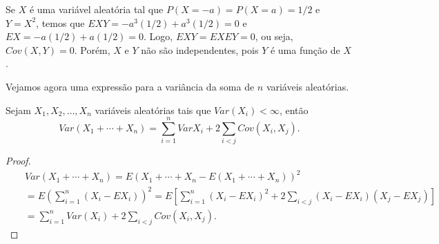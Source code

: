 \begin{frame}
%
%
\begin{exem}
Se $X$ é uma variável aleatória tal que $P(X=-a)=P(X=a)=1/2$ e
$Y=X^2$, temos que $EXY=-a^3(1/2)+a^3(1/2)=0$ e
$EX=-a(1/2)+a(1/2)=0$. Logo, $EXY=EXEY=0$, ou seja, $Cov(X,Y)=0$.
Porém, $X$ e $Y$ não são independentes, pois $Y$ é uma função de
$X$.
\end{exem}
%
%
%
%
Vejamos agora uma expressão para a variância da soma de $n$ variáveis aleatórias.

\begin{teo}
Sejam $X_1,X_2,\ldots,X_n$ variáveis aleatórias tais que $Var(X_i)<\infty$, então
$$Var(X_1+\cdots+X_n)=\sum_{i=1}^{n}Var X_i +2\sum_{i<j}Cov(X_i,X_j).$$
\end{teo}

\begin{proof}\vspace{-0.3cm}
\begin{eqnarray}
& & Var(X_1+\cdots+X_n)=E(X_1+\cdots+X_n-E(X_1+\cdots+X_n))^2 \nonumber\\
& & =E(\sum_{i=1}^{n}(X_i-EX_i))^2=E[\sum_{i=1}^{n}(X_i-EX_i)^2+2\sum_{i<j}(X_i-EX_i)(X_j-EX_j)] \nonumber\\
& & =\sum_{i=1}^{n}Var(X_i)+2\sum_{i<j}Cov(X_i,X_j). \nonumber
\end{eqnarray}
\end{proof}
\end{frame}
%
